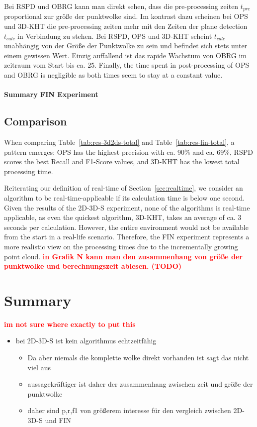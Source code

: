 \documentclass[main.tex]{subfiles}
\begin{document}
Bei RSPD und OBRG kann man direkt sehen, dass die pre-processing zeiten $t_{pre}$ proportional zur größe der punktwolke
sind. Im kontrast dazu scheinen bei OPS und 3D-KHT die pre-processing zeiten mehr mit den Zeiten der plane detection
$t_{calc}$ in Verbindung zu stehen. Bei RSPD, OPS und 3D-KHT scheint $t_{calc}$ unabhängig von der Größe der Punktwolke
zu sein und befindet sich stets unter einem gewissen Wert. Einzig auffallend ist das rapide Wachstum von OBRG im zeitraum
vom Start bis ca. 25.
Finally, the time spent in post-processing of OPS and OBRG is negligible as both times seem to stay at a constant
value.

\paragraph{Summary FIN Experiment}

\subsection{Comparison}
When comparing Table~\ref{tab:res-3d2ds-total} and Table~\ref{tab:res-fin-total}, a pattern emerges:
OPS has the highest precision with ca. 90\% and ca. 69\%, RSPD scores the best Recall and F1-Score values, and 3D-KHT has the lowest total
processing time.

Reiterating our definition of real-time of Section~\ref{sec:realtime}, we consider an algorithm to be real-time-applicable if its calculation time is below one second.
Given the results of the 2D-3D-S experiment, none of the algorithms is real-time applicable, as even the quickest algorithm, 3D-KHT, takes
an average of ca. 3 seconds per calculation.
However, the entire environment would not be available from the start in a real-life scenario. Therefore, the FIN experiment represents a more realistic
view on the processing times due to the incrementally growing point cloud. \textbf{\textcolor{red}{in Grafik N kann man den zusammenhang
        von größe der punktwolke und berechnungszeit ablesen. (TODO)}}

\section{Summary}

\textbf{\textcolor{red}{im not sure where exactly to put this}}
\begin{itemize}
    \item bei 2D-3D-S ist kein algorithmus echtzeitfähig
          \begin{itemize}
              \item Da aber niemals die komplette wolke direkt vorhanden ist sagt das nicht viel aus
              \item aussagekräftiger ist daher der zusammenhang zwischen zeit und größe der punktwolke
              \item daher sind p,r,f1 von größerem interesse für den vergleich zwischen 2D-3D-S und FIN
          \end{itemize}
\end{itemize}
\end{document}
